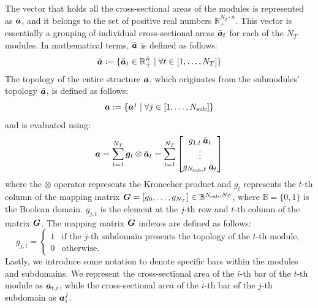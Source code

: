 The vector that holds all the cross-sectional areas of the modules is represented as $\bar{\bm{a}}$, and it belongs to the set of positive real numbers $\mathbb{R}_+^{N_T \cdot \bar{n}}$. This vector is essentially a grouping of individual cross-sectional areas $\bar{\bm{a}}_t$ for each of the $N_T$ modules. In mathematical terms, $\bar{\bm{a}}$ is defined as follows:
\begin{equation}
    \bar{\bm{a}} :=  \{ \bar{\bm{a}}_t \in \mathbb{R}_+^{\bar{n}} \;|\; \forall t \in [1,\dots,N_T]\}
\end{equation}
The topology of the entire structure $\bm{a}$, which originates from the submodules' topology $\bar{\bm{a}}$, is defined as follows:
\begin{equation}
    \bm{a} :=  \{\bm{a}^j \;|\; \forall j \in [1,\dots,N_{\text{sub}}]\}
\end{equation}
and is evaluated using:
\begin{equation}
    \bm{a} = \sum_{t=1}^{N_T} \bm{g}_t\otimes\bar{\bm{a}}_t = \sum_{t=1}^{N_T} \begin{bmatrix}
        g_{1,t} \: \bar{\bm{a}}_t \\
        \vdots\\
        g_{N_{\text{sub}},t} \: \bar{\bm{a}}_t 
        \end{bmatrix}
\end{equation}
where the $\otimes$ operator represents the Kronecher product and $g_{t}$ represents the $t$-th column of the mapping matrix $\bm{G} = [g_0,\dots,g_{N_T}] \in \mathbb{B}^{N_{\text{sub}},N_T}$, where $\mathbb{B}=\lbrace 0,1 \rbrace$ is the Boolean domain. $g_{j,t}$ is the element at the $j$-th row and $t$-th column of the matrix $\bm{G}$. The mapping matrix $\bm{G}$ indexes are defined as follows:
\begin{equation}
    g_{j,t} =
    \begin{cases}
      1 & \text{if the $j$-th subdomain presents the topology of the $t$-th module,} \\
      0 & \text{otherwise.} 
    \end{cases}
\end{equation}
Lastly, we introduce some notation to denote specific bars within the modules and subdomains. We represent the cross-sectional area of the $i$-th bar of the $t$-th module as $\bar{\bm{a}}_{t,i}$, while the cross-sectional area of the $i$-th bar of the $j$-th subdomain as $\bm{a}^j_i$.

